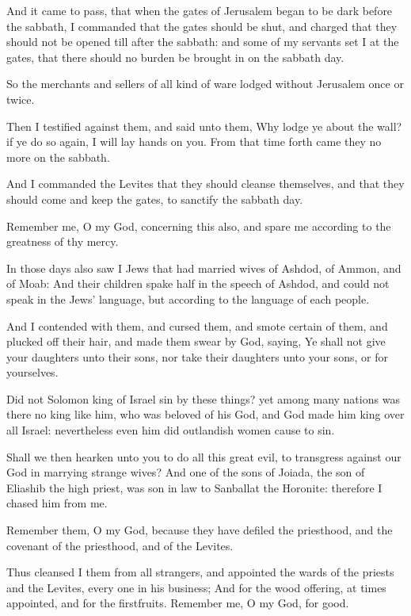 \verse And it came to pass, that when the gates of Jerusalem began to be dark before the sabbath, I commanded that the gates should be shut, and charged that they should not be opened till after the sabbath: and some of my servants set I at the gates, that there should no burden be brought in on the sabbath day.

\verse So the merchants and sellers of all kind of ware lodged without Jerusalem once or twice.

\verse Then I testified against them, and said unto them, Why lodge ye about the wall? if ye do so again, I will lay hands on you. From that time forth came they no more on the sabbath.

\verse And I commanded the Levites that they should cleanse themselves, and that they should come and keep the gates, to sanctify the sabbath day.

Remember me, O my God, concerning this also, and spare me according to the greatness of thy mercy.

\verse In those days also saw I Jews that had married wives of Ashdod, of Ammon, and of Moab: \verse And their children spake half in the speech of Ashdod, and could not speak in the Jews' language, but according to the language of each people.

\verse And I contended with them, and cursed them, and smote certain of them, and plucked off their hair, and made them swear by God, saying, Ye shall not give your daughters unto their sons, nor take their daughters unto your sons, or for yourselves.

\verse Did not Solomon king of Israel sin by these things? yet among many nations was there no king like him, who was beloved of his God, and God made him king over all Israel: nevertheless even him did outlandish women cause to sin.

\verse Shall we then hearken unto you to do all this great evil, to transgress against our God in marrying strange wives?  \verse And one of the sons of Joiada, the son of Eliashib the high priest, was son in law to Sanballat the Horonite: therefore I chased him from me.

\verse Remember them, O my God, because they have defiled the priesthood, and the covenant of the priesthood, and of the Levites.

\verse Thus cleansed I them from all strangers, and appointed the wards of the priests and the Levites, every one in his business; \verse And for the wood offering, at times appointed, and for the firstfruits.  Remember me, O my God, for good.

